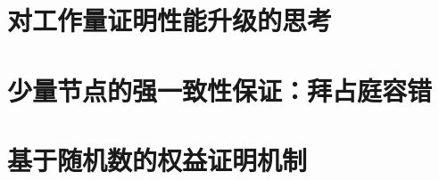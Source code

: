 \documentclass[12pt]{article}
\begin{document}
\part{对工作量证明性能升级的思考}


%
\part{少量节点的强一致性保证：拜占庭容错}



\part{基于随机数的权益证明机制}



%
%
%
%
%
%
\newpage


\newpage
%
%
\end{document}
